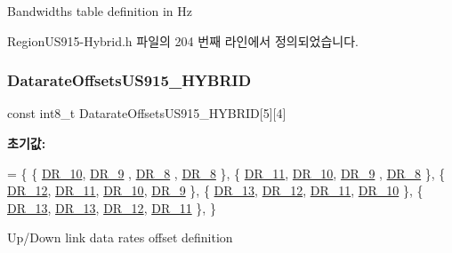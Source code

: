 Bandwidths table definition in Hz 

Region\+U\+S915-\/\+Hybrid.\+h 파일의 204 번째 라인에서 정의되었습니다.

\mbox{\label{group___r_e_g_i_o_n_u_s915_h_y_b_ga5a529866ea886b5f171f6c49fb7fdbcd}} 
\subsubsection{\texorpdfstring{Datarate\+Offsets\+U\+S915\+\_\+\+H\+Y\+B\+R\+ID}{DatarateOffsetsUS915\_HYBRID}}
{\footnotesize\ttfamily const int8\+\_\+t Datarate\+Offsets\+U\+S915\+\_\+\+H\+Y\+B\+R\+ID\mbox{[}5\mbox{]}\mbox{[}4\mbox{]}\hspace{0.3cm}{\ttfamily [static]}}

{\bfseries 초기값\+:}
\begin{DoxyCode}
=
\{
    \{ \mbox{\hyperlink{group___r_e_g_i_o_n_ga8cc471faabc38682537f6a60a30844e4}{DR\_10}}, \mbox{\hyperlink{group___r_e_g_i_o_n_ga67346d631ba28781d6dffb2a7b6fd22f}{DR\_9}} , \mbox{\hyperlink{group___r_e_g_i_o_n_ga44cc96ba80ae464cd9330b784d329c16}{DR\_8}} , \mbox{\hyperlink{group___r_e_g_i_o_n_ga44cc96ba80ae464cd9330b784d329c16}{DR\_8}}  \}, 
    \{ \mbox{\hyperlink{group___r_e_g_i_o_n_ga77672781eaa7dc6f6892195739a5ef27}{DR\_11}}, \mbox{\hyperlink{group___r_e_g_i_o_n_ga8cc471faabc38682537f6a60a30844e4}{DR\_10}}, \mbox{\hyperlink{group___r_e_g_i_o_n_ga67346d631ba28781d6dffb2a7b6fd22f}{DR\_9}} , \mbox{\hyperlink{group___r_e_g_i_o_n_ga44cc96ba80ae464cd9330b784d329c16}{DR\_8}}  \}, 
    \{ \mbox{\hyperlink{group___r_e_g_i_o_n_gafcf0cda11eda5db3d4c4e9a5bd79c0d5}{DR\_12}}, \mbox{\hyperlink{group___r_e_g_i_o_n_ga77672781eaa7dc6f6892195739a5ef27}{DR\_11}}, \mbox{\hyperlink{group___r_e_g_i_o_n_ga8cc471faabc38682537f6a60a30844e4}{DR\_10}}, \mbox{\hyperlink{group___r_e_g_i_o_n_ga67346d631ba28781d6dffb2a7b6fd22f}{DR\_9}}  \}, 
    \{ \mbox{\hyperlink{group___r_e_g_i_o_n_ga226f47470cc69a6fe831f7c92709bc1f}{DR\_13}}, \mbox{\hyperlink{group___r_e_g_i_o_n_gafcf0cda11eda5db3d4c4e9a5bd79c0d5}{DR\_12}}, \mbox{\hyperlink{group___r_e_g_i_o_n_ga77672781eaa7dc6f6892195739a5ef27}{DR\_11}}, \mbox{\hyperlink{group___r_e_g_i_o_n_ga8cc471faabc38682537f6a60a30844e4}{DR\_10}} \}, 
    \{ \mbox{\hyperlink{group___r_e_g_i_o_n_ga226f47470cc69a6fe831f7c92709bc1f}{DR\_13}}, \mbox{\hyperlink{group___r_e_g_i_o_n_ga226f47470cc69a6fe831f7c92709bc1f}{DR\_13}}, \mbox{\hyperlink{group___r_e_g_i_o_n_gafcf0cda11eda5db3d4c4e9a5bd79c0d5}{DR\_12}}, \mbox{\hyperlink{group___r_e_g_i_o_n_ga77672781eaa7dc6f6892195739a5ef27}{DR\_11}} \}, 
\}
\end{DoxyCode}
Up/\+Down link data rates offset definition 

